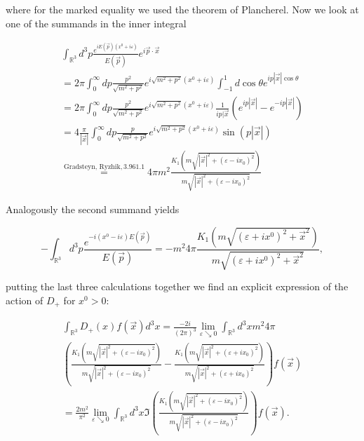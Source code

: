 \documentclass[a4paper,11pt]{article}
\begin{document}
where for the marked equality we used the theorem of Plancherel. Now we look at one of the summands in the inner integral

\begin{align}
\int_{\mathbb{R}^3}d^3p \frac{e^{iE(\vec{p})(x^0+i\varepsilon)}}{E(\vec{p})} e^{i\vec{p}\cdot\vec{x}} \\
= 2\pi \int_0^\infty dp \frac{p^2}{\sqrt{m^2+p^2}} e^{i \sqrt{m^2+p^2}(x^0+i\varepsilon)} \int_{-1}^1 d \cos \theta e^{i p |\vec{x}| \cos \theta}\\
=2\pi \int_0^\infty dp \frac{p^2}{\sqrt{m^2+p^2}} e^{i \sqrt{m^2+p^2}(x^0+i\varepsilon)} \frac{1}{i p |\vec{x}} \left(e^{i p |\vec{x}|} - e^{-i p |\vec{x}|}\right)\\
=4\frac{\pi}{|\vec{x}|} \int_0^\infty dp \frac{p}{\sqrt{m^2+p^2}} e^{i \sqrt{m^2+p^2}(x^0+i\varepsilon)} \sin( p |\vec{x}|)\\
\overset{\text{Gradsteyn, Ryzhik}, 3.961.1}{=} 4\pi m^2 \frac{K_1\left(m \sqrt{|\vec{x}|^2 + (\varepsilon - i x_0)^2}\right)}{m \sqrt{|\vec{x}|^2 + (\varepsilon - i x_0)^2}}
\end{align}

Analogously the second summand yields 

\begin{equation}
-\int_{\mathbb{R}^3}d^3p \frac{e^{-i(x^0-i\varepsilon)E(\vec{p})}}{E(\vec{p})}= -m^2 4 \pi \frac{K_1\left( m \sqrt{(\varepsilon + i x^0)^2+\vec{x}^2}\right)}{ m \sqrt{(\varepsilon + i x^0)^2+\vec{x}^2}},
\end{equation}

putting the last three calculations together we find an explicit expression of the action of \(D_+\)
for \(x^0>0\):

\begin{align}
\int_{\mathbb{R}^3} D_+(x)f(\vec{x})d^3x= \frac{-2i}{(2\pi)^3} \lim_{\varepsilon \searrow 0} \int_{\mathbb{R}^3} d^3 x  m^2 4\pi \\
\left(\frac{K_1\left(m \sqrt{|\vec{x}|^2 + (\varepsilon - i x_0)^2}\right)}{m \sqrt{|\vec{x}|^2 + (\varepsilon - i x_0)^2}}
-\frac{K_1\left(m \sqrt{|\vec{x}|^2 + (\varepsilon + i x_0)^2}\right)}{m \sqrt{|\vec{x}|^2 + (\varepsilon + i x_0)^2}}
  \right) f(\vec{x})\\
  =\frac{2 m^2}{\pi^2} \lim_{\varepsilon \searrow 0} \int_{\mathbb{R}^3} d^3x \Im\left( \frac{K_1\left(m \sqrt{|\vec{x}|^2 + (\varepsilon - i x_0)^2}\right)}{m \sqrt{|\vec{x}|^2 + (\varepsilon - i x_0)^2}}
  \right) f(\vec{x}).
  \end{align}
\end{document}
